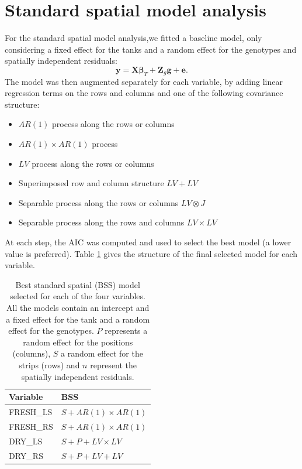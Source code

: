 \section{Standard spatial model analysis}
For the standard spatial model analysis,we fitted a baseline model, only considering a fixed effect for the tanks and a random effect for the genotypes and spatially independent residuals:
\begin{equation}
	\mathbf{y} =\mathbf{X} \boldsymbol{\beta}_{T} + \mathbf{Z}_{g} \mathbf{g}+ \mathbf{e} \text{.}
\end{equation}
The model was then augmented separately for each variable, by adding linear regression terms on the rows and columns and one of the following covariance structure:
\begin{itemize}
\item $AR(1)$ process along the rows or columns
\item $AR(1) \times AR(1)$ process
\item $LV$ process along the rows or columns
\item Superimposed row and column structure $LV + LV$
\item Separable process along the rows or columns $LV\otimes J$
\item Separable process along the rows and columns $LV \times LV$
\end{itemize}
At each step, the AIC  was computed and used to select the best model (a lower value is preferred). Table \ref{tab:selected_BSS_models} gives the structure of the final selected model for each variable.\\

\begin{table}[htbp]
  \centering
  \caption[Selected BSS models]{Best standard spatial (BSS) model selected for each of the four variables. All the models 
  contain an intercept and a fixed effect for the tank and a random effect for the genotypes. $P$ represents a random effect for the positions (columns), $S$ a random effect for the strips (rows) and $n$ represent the spatially independent residuals.}
    \begin{tabular}{ll}
    \toprule
    Variable & \multicolumn{1}{l}{BSS} \\
    \midrule
    FRESH\_LS & $ S + AR(1) \times AR(1)$  \\
    FRESH\_RS &  $ S + AR(1) \times AR(1)$ \\
    DRY\_LS & $S + P + LV\times LV$ \\
    DRY\_RS &  $S + P + LV+LV$\\
    \bottomrule
    \end{tabular}%
\label{tab:selected_BSS_models}
\end{table}%

